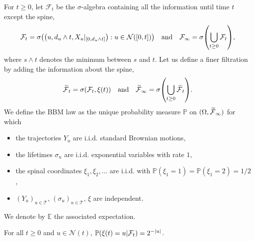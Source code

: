 \documentclass[AHL,Unicode,longabstracts,published]{cedram}
\newcommand{\E}{\mathbb{E}}
\renewcommand{\P}{\mathbb{P}}
\newcommand\1{\mathds{1}}
\newcommand{\cF}{\mathcal{F}}
\newcommand{\cN}{\mathcal{N}}
\newcommand{\cT}{\mathcal{T}}
\let\oldtilde\tilde
\renewcommand*{\tilde}[1]{\mathchoice{\widetilde{#1}}{\widetilde{#1}}{\oldtilde{#1}}{\oldtilde{#1}}}
\let\originalleft\left
\let\originalright\right
\renewcommand{\left}{\mathopen{}\mathclose\bgroup\originalleft}
\renewcommand{\right}{\aftergroup\egroup\originalright}
\begin{document}
For $t \geq 0$, let $\cF_t$ be the $\sigma$-algebra containing all the information until time $t$ except the spine,
\begin{equation*}
\cF_t = \sigma \left(\left(u, d_u \wedge t, X_u|_{[0, d_u \wedge t]} \right) : u \in \cN([0, t]) \right) \quad \text{and} \quad \cF_\infty = \sigma \left(\bigcup_{t \geq 0} \cF_t \right),
\end{equation*}
where $s \wedge t$ denotes the minimum between $s$ and $t$. Let us define a finer filtration by adding the information about the spine,
\begin{equation*}
\tilde{\cF}_t = \sigma \left(\cF_t, \xi(t) \right) \quad \text{and} \quad \tilde{\cF}_\infty = \sigma \left(\bigcup_{t \geq 0} \tilde{\cF}_t \right).
\end{equation*}
We define the BBM law as the unique probability measure $\P$ on $(\Omega, \tilde{\cF}_\infty)$ for which
\begin{itemize}
\item the trajectories $Y_u$ are i.i.d. standard Brownian motions,
\item the lifetimes $\sigma_u$ are i.i.d. exponential variables with rate $1$,
\item the spinal coordinates $\xi_1, \xi_2, \dots$ are i.i.d. with $\P(\xi_1 = 1) = \P(\xi_1 = 2) = 1/2$,
\item $(Y_u)_{u \in \cT}$, $(\sigma_u)_{u \in \cT}$, $\xi$ are independent.
\end{itemize}
We denote by $\E$ the associated expectation.

\begin{rema}\label{rem:probability_to_be_the_spine}
For all $t \geq 0$ and $u \in \cN(t)$, $\P \left(\xi(t) = u \middle| \cF_t \right) = 2^{-|u|}$.
\end{rema}
\end{document}
